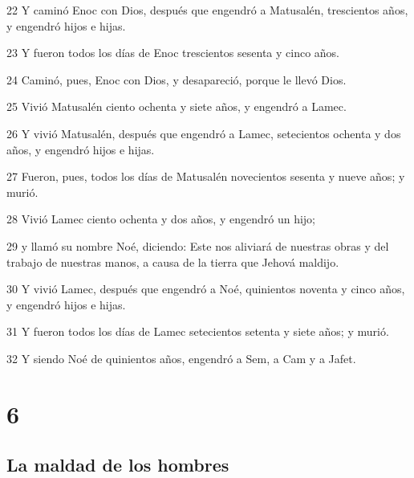\par 22 Y caminó Enoc con Dios, después que engendró a Matusalén, trescientos años, y engendró hijos e hijas.
\par 23 Y fueron todos los días de Enoc trescientos sesenta y cinco años.
\par 24 Caminó, pues, Enoc con Dios, y desapareció, porque le llevó Dios.
\par 25 Vivió Matusalén ciento ochenta y siete años, y engendró a Lamec.
\par 26 Y vivió Matusalén, después que engendró a Lamec, setecientos ochenta y dos años, y engendró hijos e hijas.
\par 27 Fueron, pues, todos los días de Matusalén novecientos sesenta y nueve años; y murió.
\par 28 Vivió Lamec ciento ochenta y dos años, y engendró un hijo;
\par 29 y llamó su nombre Noé, diciendo: Este nos aliviará de nuestras obras y del trabajo de nuestras manos, a causa de la tierra que Jehová maldijo.
\par 30 Y vivió Lamec, después que engendró a Noé, quinientos noventa y cinco años, y engendró hijos e hijas.
\par 31 Y fueron todos los días de Lamec setecientos setenta y siete años; y murió.
\par 32 Y siendo Noé de quinientos años, engendró a Sem, a Cam y a Jafet.

\chapter{6}

\section*{La maldad de los hombres}

